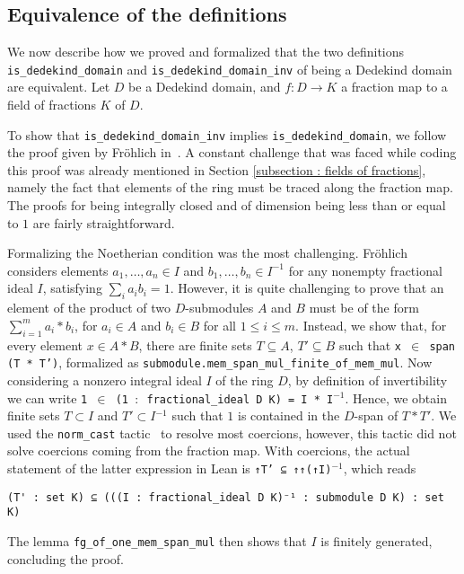 \documentclass[sn-mathphys]{sn-jnl}%
\newcommand{\inv}{\ensuremath{{}^{-1}}}
\newcommand{\lean}[1]{\texttt{#1}\xspace}
\begin{document}
\subsection{Equivalence of the definitions} \label{sec:equivalence}
We now describe how we proved and formalized that the two definitions \lean{is\_dedekind\_domain} and \lean{is\_dedekind\_domain\_inv} of being a Dedekind domain are equivalent. Let $D$ be a Dedekind domain, and $f\colon D\to K$ a fraction map to a field of fractions $K$ of $D$.

To show that \lean{is\_dedekind\_domain\_inv} implies \lean{is\_dedekind\_domain}, we follow the proof given by Fr\"ohlich in~\cite[Chapter 1, \S~2, ~Proposition 1.2.1]{frohlich}. A constant challenge that was faced while coding this proof was already mentioned in Section \ref{subsection : fields of fractions}, namely the fact that elements of the ring must be traced along the fraction map.
The proofs for being integrally closed and of dimension being less than or equal to $1$ are fairly straightforward.

Formalizing the Noetherian condition was the most challenging. Fr\"ohlich considers elements $a_1, \dots, a_n \in I$ and $b_1, \dots, b_n \in I^{-1}$ for any nonempty fractional ideal $I$,
satisfying $ \sum_i a_i b_i = 1 $.
However, it is quite challenging to prove that an element of the product of two $D$-submodules $A$ and $B$ must be of the form $\sum_{i = 1}^m a_i*b_i$, for $a_i \in A$ and $b_i \in B$ for all $1 \leq i \leq m$.
Instead, we show that, for every element $x\in A\ast B$, there are finite sets $T\subseteq A$, $T'\subseteq B$ such that \lean{x $\in$ span (T * T')}, formalized as
\lean{submodule.mem\_span\_mul\_finite\-\_of\-\_mem\-\_mul}.
Now considering a nonzero integral ideal $I$ of the ring $D$, by definition of invertibility we can write \lean{1 $\in$ (1 $:$ fractional\_ideal D K) = I * I\inv}. Hence, we obtain 
finite sets $T \subset I$ and $T' \subset I\inv$ such that $1$ is contained in the $D$-span of $T*T'$. We used the \lean{norm\_cast} tactic~\cite{norm_cast} to resolve most coercions, however, this tactic did not solve coercions coming from the fraction map. With coercions, the actual statement of the latter expression in Lean is \lean{↑T' ⊆ ↑↑(↑I)\inv}, which reads
\begin{lstlisting}
(T' : set K) ⊆ (((I : fractional_ideal D K)⁻¹ : submodule D K) : set K)
\end{lstlisting}
The lemma \lean{fg\_of\_one\_mem\_span\_mul} then shows that $I$ is finitely generated, concluding the proof.
\end{document}
